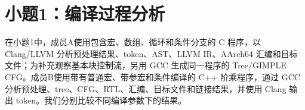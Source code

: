\section{小题1：编译过程分析}

在小题1中，成员A使用包含宏、数组、循环和条件分支的 C 程序，以 Clang/LLVM 分析预处理结果、token、AST、LLVM IR、AArch64 汇编和目标文件；为补充观察基本块控制流，另用 GCC 生成同一程序的 Tree/GIMPLE CFG。成员B使用带有普通宏、带参宏和条件编译的 C++ 阶乘程序，通过 GCC 分析预处理、tree、CFG、RTL、汇编、目标文件和链接结果，并使用 Clang 输出 token。我们分别比较不同编译参数下的结果。
